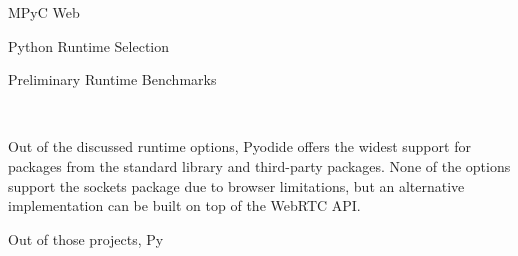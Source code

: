 \begin{block}{MPyC Web}
\begin{block}{Python Runtime Selection}
\begin{block}{Preliminary Runtime Benchmarks}
\begin{Shaded}
\begin{Highlighting}[]
    \NormalTok{ [}\NormalTok{] }\OperatorTok{+}\NormalTok{ [x }\NormalTok{ x]}
\OperatorTok{=}
\end{Highlighting}
\end{Shaded}

Out of the discussed runtime options, Pyodide offers the widest support for packages from the standard library and third-party packages. None of the options support the sockets package due to browser limitations, but an alternative implementation can be built on top of the WebRTC API.

Out of those projects, Py

\newpage


\end{block}
\end{block}
\end{block}

